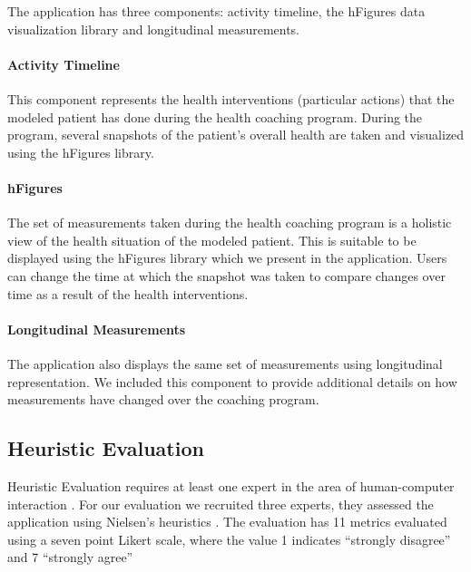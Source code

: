 \documentclass[twocolumn]{bmcart}%
\begin{document}
The application has three components: activity timeline, the hFigures data visualization library and longitudinal measurements.

\paragraph*{Activity Timeline} This component represents the health interventions (particular actions) that the modeled patient has done during the health coaching program. During the program, several snapshots of the patient's overall health are taken and visualized using the hFigures library.

\paragraph*{hFigures} The set of measurements taken during the health coaching program is a holistic view of the health situation of the modeled patient. This is suitable to be displayed using the hFigures library which we present in the application. Users can change the time at which the snapshot was taken to compare changes over time as a result of the health interventions.

\paragraph*{Longitudinal Measurements} The application also displays the same set of measurements using longitudinal representation. We included this component to provide additional details on how measurements have changed over the coaching program.

\subsection*{Heuristic Evaluation}

Heuristic Evaluation requires at least one expert in the area of human-computer interaction \cite{nielsen1994usability, johnson2011ehr}. For our evaluation we recruited three experts, they assessed the application using Nielsen's heuristics \cite{nielsen1994usability}. The evaluation has 11 metrics evaluated using a seven point Likert scale, where the value 1 indicates ``strongly disagree'' and 7 ``strongly agree''

\end{document}
